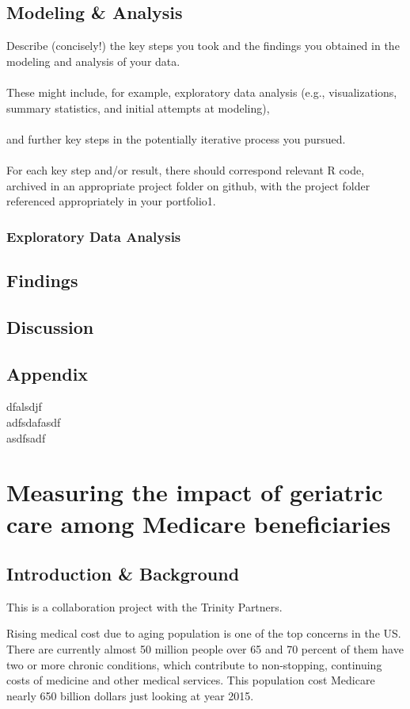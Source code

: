 \documentclass{article}
\begin{document}
	\subsection{Modeling \& Analysis}
	Describe (concisely!) the key steps you took and the findings you obtained in the modeling and analysis of your data.\\
	\\
	These might include, for example, exploratory data analysis (e.g., visualizations, summary statistics, and initial attempts at modeling),\\
	\\
	and further key steps in the potentially iterative process you pursued. \\
	\\
	For each key step and/or result, there should correspond relevant R code, archived in an appropriate project folder on github, with the project folder referenced appropriately in your portfolio1.
		\subsubsection{Exploratory Data Analysis}
	\subsection{Findings}
	\subsection{Discussion}
	\subsection{Appendix}
	dfalsdjf\\
	adfsdafasdf\\
	asdfsadf\\
	
	
	
	
	\section{Measuring the impact of geriatric care among Medicare beneficiaries}
	\subsection{Introduction \& Background} 
	
	This is a collaboration project with the Trinity Partners. 
	
	Rising medical cost due to aging population is one of the top concerns in the US.  There are currently almost 50 million people over 65 and 70 percent of them have two or more chronic conditions, which contribute to non-stopping, continuing costs of medicine and other medical services. This population cost Medicare nearly 650 billion dollars just looking at year 2015.  
	
\end{document}
